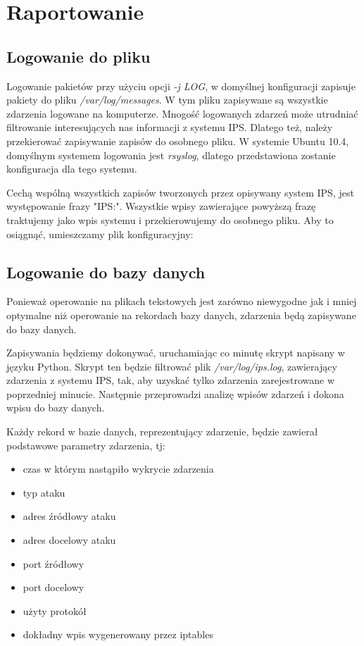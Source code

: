 \chapter{Raportowanie}
	\section{Logowanie do pliku}
		Logowanie pakietów przy użyciu opcji \textit{-j LOG}, w domyślnej konfiguracji zapisuje pakiety do pliku \textit{/var/log/messages}.
		W tym pliku zapisywane są wszystkie zdarzenia logowane na komputerze.
		Mnogość logowanych zdarzeń może utrudniać filtrowanie interesujących nas informacji z systemu IPS.
		Dlatego też, należy przekierować zapisywanie zapisów do osobnego pliku.
		W systemie Ubuntu 10.4, domyślnym systemem logowania jest \textit{rsyslog}, dlatego przedstawiona zostanie konfiguracja dla tego systemu.
		
		Cechą wspólną wszystkich zapisów tworzonych przez opisywany system IPS, jest występowanie frazy "IPS:".
		Wszystkie wpisy zawierające powyższą frazę traktujemy jako wpis systemu i przekierowujemy do osobnego pliku.
		Aby to osiągnąć, umieszczamy plik konfiguracyjny:
		
	\section{Logowanie do bazy danych}
		Ponieważ operowanie na plikach tekstowych jest zarówno niewygodne jak i mniej optymalne niż operowanie na rekordach bazy danych, zdarzenia będą zapisywane do bazy danych.

		Zapisywania będziemy dokonywać, uruchamiając co minutę skrypt napisany w języku Python.
		Skrypt ten będzie filtrować plik \textit{/var/log/ips.log}, zawierający zdarzenia z systemu IPS, tak, aby uzyskać tylko zdarzenia zarejestrowane w poprzedniej minucie.
		Następnie przeprowadzi analizę wpisów zdarzeń i dokona wpisu do bazy danych.

		Każdy rekord w bazie danych, reprezentujący zdarzenie, będzie zawierał podstawowe parametry zdarzenia, tj:
		\begin{itemize}
			\item czas w którym nastąpiło wykrycie zdarzenia
			\item typ ataku
			\item adres źródłowy ataku
			\item adres docelowy ataku
			\item port źródłowy
			\item port docelowy
			\item użyty protokół
			\item dokładny wpis wygenerowany przez iptables
		\end{itemize}
